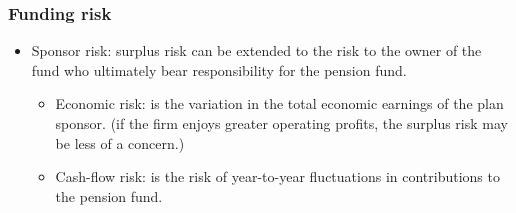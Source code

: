 \subsubsection{Funding risk}
\begin{itemize}
\item Sponsor risk: surplus risk can be extended to the risk to the owner of the fund who ultimately bear responsibility for the pension fund.
    \begin{itemize}
    \item Economic risk: is the variation in the total economic earnings of the plan sponsor. (if the firm enjoys greater operating profits, the surplus risk may be less of a concern.)
    \item Cash-flow risk: is the risk of year-to-year fluctuations in contributions to the pension fund.
    \end{itemize}
\end{itemize}











